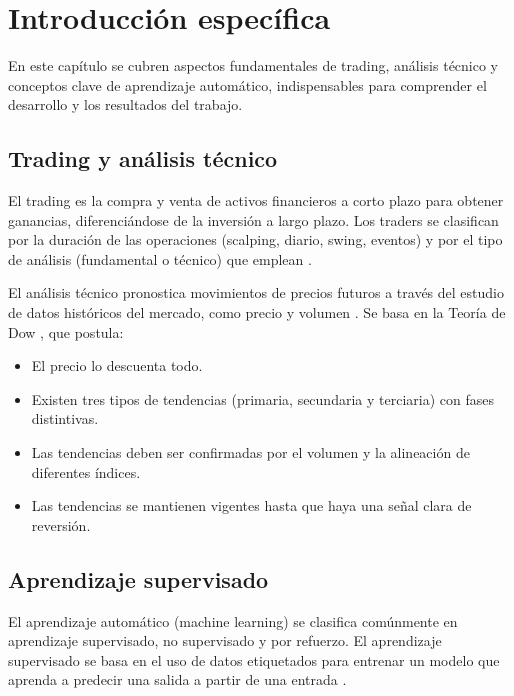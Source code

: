 \chapter{Introducción específica} %

\label{Chapter2}

En este capítulo se cubren aspectos fundamentales de trading, análisis técnico y conceptos clave de aprendizaje automático, indispensables para comprender el desarrollo y los resultados del trabajo.

\section{Trading y análisis técnico}

El trading es la compra y venta de activos financieros a corto plazo para obtener ganancias, diferenciándose de la inversión a largo plazo. Los traders se clasifican por la duración de las operaciones (scalping, diario, swing, eventos) y por el tipo de análisis (fundamental o técnico) que emplean \cite{Chen:2023, Zucchi:2022, Chan:2013}.

El análisis técnico pronostica movimientos de precios futuros a través del estudio de datos históricos del mercado, como precio y volumen \cite{Kirkpatrick:2006, Rhea:1932, Hayes:2022}. Se basa en la Teoría de Dow \cite{Lopez:2018}, que postula:
\begin{itemize}
    \item El precio lo descuenta todo.
    \item Existen tres tipos de tendencias (primaria, secundaria y terciaria) con fases distintivas.
    \item Las tendencias deben ser confirmadas por el volumen y la alineación de diferentes índices.
    \item Las tendencias se mantienen vigentes hasta que haya una señal clara de reversión.
\end{itemize}

\section{Aprendizaje supervisado}

El aprendizaje automático (machine learning) se clasifica comúnmente en aprendizaje supervisado, no supervisado y por refuerzo. El aprendizaje supervisado se basa en el uso de datos etiquetados para entrenar un modelo que aprenda a predecir una salida a partir de una entrada \cite{Jansen:2020}.

